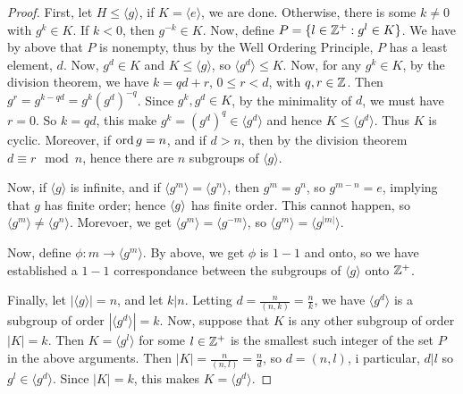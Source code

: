 \begin{proof}
  First, let $H \leq \langle g \rangle$, if $K=\langle e \rangle$, we are done.
  Otherwise, there is some $k \neq 0$ with  $g^k \in K$. If  $k<0$, then
  $g^{-k} \in K$. Now, define $P=\{l \in \mathbb{Z}^+ : g^l \in K\}$. We have by above
  that $P$ is nonempty, thus by the Well Ordering Principle,  $P$ has a
  least element, $d$. Now,  $g^d \in K$ and  $K \leq \langle g \rangle$, so
  $\langle g^d \rangle \leq K$. Now, for any $g^k \in K$, by the division
  theorem, we have  $k=qd+r$, $0 \leq r < d$, with  $q, r \in \mathbb{Z}$. Then
  $g^r=g^{k-qd}=g^k(g^d)^{-q}$. Since $g^k,g^d \in K$, by the minimality of
  $d$, we must have  $r=0$. So $k=qd$, this make $g^k=(g^d)^q \in
  \langle g^d \rangle$ and hence $K \leq \langle g^d \rangle$. Thus $K$ is
  cyclic. Moreover, if $\operatorname{ord}{g}=n$, and if $d>n$, then by the division theorem
  $d \equiv r \mod{n}$, hence there are  $n$ subgroups of $\langle g
  \rangle$.

  Now, if $\langle g \rangle$ is infinite, and if $\langle g^m
  \rangle=\langle g^n \rangle$, then $g^m=g^n$, so $g^{m-n}=e$, implying that
  $g$ has finite order; hence $\langle g\rangle$ has finite order. This cannot happen,
  so  $\langle g^m \rangle \neq \langle g^n \rangle$. Morevoer, we get
  $\langle g^m \rangle=\langle g^{-m} \rangle$, so $\langle g^m
  \rangle=\langle g^{|m|} \rangle$.

  Now, define $\phi:m \rightarrow \langle g^m \rangle$. By above, we get $\phi$
  is $1-1$ and onto, so we have established  a  $1-1$ correspondance between
  the subgroups of  $\langle g \rangle$ onto $\mathbb{Z}^+$.

  Finally, let $|\langle g \rangle|=n$, and let $k|n$. Letting
  $d=\frac{n}{(n,k)}=\frac{n}{k}$, we have $\langle g^d \rangle$ is a
  subgroup of order $|\langle g^d \rangle|=k$. Now, suppose that $K$
  is any other subgroup of order  $|K|=k$. Then $K=\langle g^l
  \rangle$ for some $l \in \mathbb{Z}^+$ is the smallest such integer of the
  set $P$ in the above arguments. Then
  $|K|=\frac{n}{(n,l)}=\frac{n}{d}$, so $d=(n,l)$, i particular, $d|l$
  so  $g^l \in \langle g^d \rangle$. Since $|K|=k$, this makes
  $K=\langle g^d \rangle$.
\end{proof}

